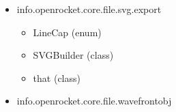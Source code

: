 \documentclass{amsdtx}
\begin{document}
\begin{itemize}
\begin{itemize}
    \begin{itemize}
    
    \item
      AbstractElementHandler (class) --- implements E
    \item
      DelegatorHandler (class) --- extends D
    \item
      ElementHandler (interface)
    \item
      NullElementHandler (class) --- extends A
    \item
      PlainTextHandler (class) --- extends A
    \item
      SimpleSAX (class)
    \item
      XMLReaderCache (class)
    \item
      can (class)
    \item
      for (class)
    \item
      handles (class)
    \end{itemize}
  \item
    info.openrocket.core.file.svg.export

    \begin{itemize}
    
    \item
      LineCap (enum)
    \item
      SVGBuilder (class)
    \item
      that (class)
    \end{itemize}
  \item
    info.openrocket.core.file.wavefrontobj

    \begin{itemize}
    

\end{itemize}
\end{itemize}
\end{itemize}
\end{document}
